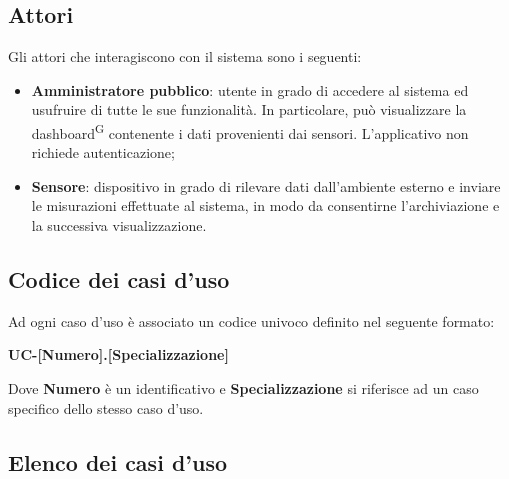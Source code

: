 \documentclass[8pt]{article}
\newcommand{\glossterm}[1]{#1\textsuperscript{G}} %
\begin{document}
\subsection{Attori}
Gli attori che interagiscono con il sistema sono i seguenti:
\begin{itemize}
    \item \textbf{Amministratore pubblico}: utente in grado di accedere al sistema ed usufruire di tutte le sue funzionalità. In particolare, può visualizzare la \glossterm{dashboard} contenente i dati provenienti dai sensori. L'applicativo non richiede autenticazione; %
    \item \textbf{Sensore}: dispositivo in grado di rilevare dati dall'ambiente esterno e inviare le misurazioni effettuate al sistema, in modo da consentirne l'archiviazione e la successiva visualizzazione.
\end{itemize}
\clearpage
\subsection{Codice dei casi d'uso}
Ad ogni caso d'uso è associato un codice univoco definito nel seguente formato:
\begin{center}
    \textbf{UC-[Numero].[Specializzazione]}
\end{center}
Dove \textbf{Numero} è un identificativo e \textbf{Specializzazione} si riferisce ad un caso specifico
dello stesso caso d'uso.

\subsection{Elenco dei casi d'uso}
\end{document}

